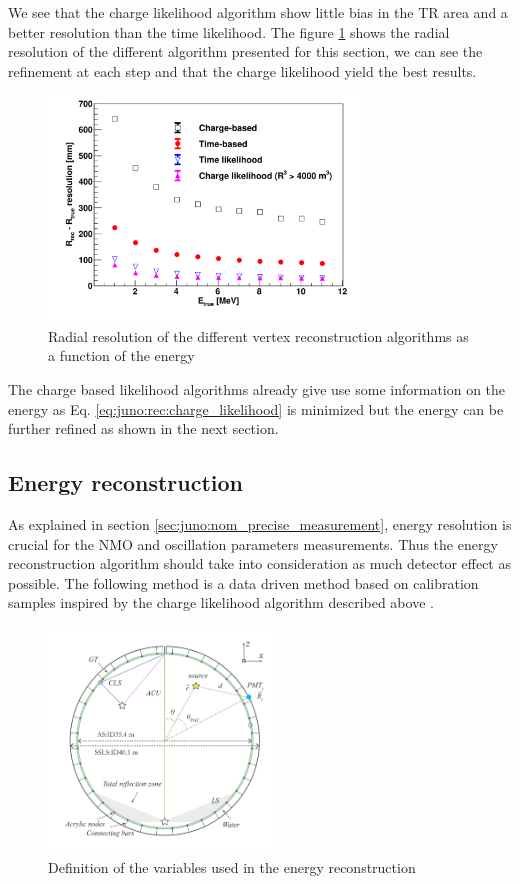 We see that the charge likelihood algorithm show little bias in the TR area and a better resolution than the time likelihood. The figure \ref{fig:juno:rec:all_class} shows the radial resolution of the different algorithm presented for this section, we can see the refinement at each step and that the charge likelihood yield the best results.

\begin{figure}[ht]
  \centering
  \includegraphics[height=6cm]{images/juno/reco/vertex_reco_classique.png}
  \caption{Radial resolution of the different vertex reconstruction algorithms as a function of the energy}
  \label{fig:juno:rec:all_class}
\end{figure}

The charge based likelihood algorithms already give use some information on the energy as Eq. \ref{eq:juno:rec:charge_likelihood} is minimized but the energy can be further refined as shown in the next section.


\subsection{Energy reconstruction}

As explained in section \ref{sec:juno:nom_precise_measurement}, energy resolution is crucial for the NMO and oscillation parameters measurements. Thus the energy reconstruction algorithm should take into consideration as much detector effect as possible. The following method is a data driven method based on calibration samples inspired by the charge likelihood algorithm described above \cite{huang_data-driven_2023}.


\begin{figure}[ht]
  \centering
  \includegraphics[height=6cm]{images/juno/reco/energy_reco_vars.png}
  \caption{Definition of the variables used in the energy reconstruction}
  \label{fig:juno:rec:energy_vars}
\end{figure}

